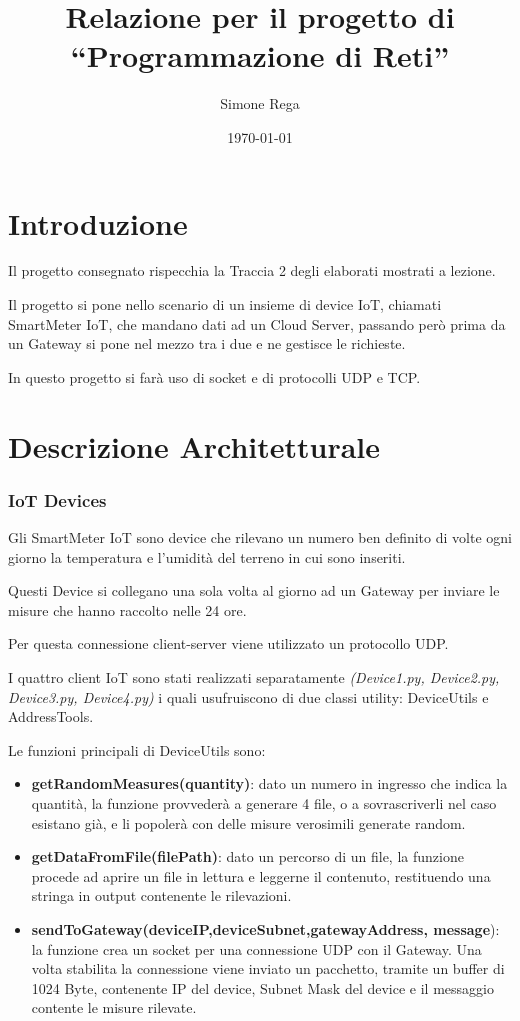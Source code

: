 \documentclass[a4paper,12pt]{report}
\title{Relazione per il progetto di\\``Programmazione di Reti''}
\author{Simone Rega}
\date{\today}
\begin{document}
	
	\maketitle
	
	\tableofcontents
	
	\chapter{Introduzione}
	
	Il progetto consegnato rispecchia la Traccia 2 degli elaborati mostrati a lezione. 
	
	Il progetto si pone nello scenario di un insieme di device IoT, chiamati SmartMeter IoT, che mandano dati ad un Cloud Server, passando però prima da un Gateway si pone nel mezzo tra i due e ne gestisce le richieste.
	
	In questo progetto si farà uso di socket e di protocolli UDP e TCP.
	
	\chapter{Descrizione Architetturale}
	\subsection{IoT Devices}
	Gli SmartMeter IoT sono device che rilevano un numero ben definito di volte ogni giorno la temperatura e l'umidità del terreno in cui sono inseriti. 
	
	Questi Device si collegano una sola volta al giorno ad un Gateway per inviare le misure che hanno raccolto nelle 24 ore.
	
	Per questa connessione client-server viene utilizzato un protocollo UDP.
	
	I quattro client IoT sono stati realizzati separatamente \textit{(Device1.py, Device2.py, Device3.py, Device4.py)} i quali usufruiscono di due classi utility: DeviceUtils e AddressTools.
	
	Le funzioni principali di DeviceUtils sono:
	\begin{itemize}
		\item\textbf{ getRandomMeasures(quantity)}: dato un numero in ingresso che indica la quantità, la funzione provvederà a generare 4 file, o a sovrascriverli nel caso esistano già, e li popolerà con delle misure verosimili generate random.
		\item \textbf{getDataFromFile(filePath)}: dato un percorso di un file, la funzione procede ad aprire un file in lettura e leggerne il contenuto, restituendo una stringa in output contenente le rilevazioni.
		\item \textbf{sendToGateway(deviceIP,deviceSubnet,gatewayAddress, message}): la funzione crea un socket per una connessione UDP con il Gateway. Una volta stabilita la connessione viene inviato un pacchetto, tramite un buffer di 1024 Byte, contenente IP del device, Subnet Mask del device e il messaggio contente le misure rilevate.
	\end{itemize}
\end{document}
